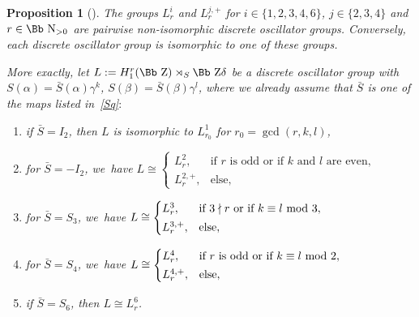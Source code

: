 \documentclass[pdftex]{sigma}
\newcommand\NN{{\mbox{\Bb N}}}
\newcommand\ZZ{{\mbox{\Bb Z}}}
\newcommand{\benur}{\begin{enumerate}[label=$(\roman*)$]\itemsep=0pt}
\numberwithin{equation}{section}
\newtheorem{Proposition}[Theorem]{Proposition}
 { \theoremstyle{definition}
\newtheorem{Definition}[Theorem]{Definition}
\newtheorem{Note}[Theorem]{Note}
\newtheorem{Example}[Theorem]{Example}
\newtheorem{Remark}[Theorem]{Remark} }
\begin{document}
\begin{Proposition}[\cite{F}]\label{TF}
The groups $L^i_r$ and $L^{j,+}_r$ for $i\in\{1,2,3,4,6\}$, $j\in\{2,3,4\}$ and $r\in\NN_{>0}$ are pairwise non-isomorphic discrete oscillator groups.
Conversely, each discrete oscillator group is isomorphic to one of these groups.

More exactly, let $L:=H_1^r(\ZZ)\rtimes_S \ZZ \delta$ be a discrete oscillator group with $S(\alpha)=\bar S(\alpha)\gamma^k$, $S(\beta)=\bar S(\beta)\gamma^l$, where we already assume that $\bar S$ is one of the maps listed in~\eqref{Sq}$:$
\benur
\item if $\bar S=I_2$, then $L$ is isomorphic to $L^1_{r_0}$ for $r_0=\gcd(r,k,l)$,
\item for $\bar S=-I_2$, we~have
$L\cong \begin{cases}
L^2_r, & \text{if $r$ is odd or if $k$ and $l$ are even},
\\[0.5ex]
L^{2,+}_r, & \text{else},
\end{cases}$
\item for $\bar S=S_3$, we~have
$L\cong \begin{cases} L^3_r, & \text{if $3\nmid r$ or if $k\equiv l\ {\rm mod}\ 3$},
\\[0.5ex]
L^{3,+}_r, & \text{else},
\end{cases}$
\item for $\bar S=S_4$, we~have
$L\cong \begin{cases} L^4_r, & \text{if $r$ is odd or if $k\equiv l\ {\rm mod}\ 2$},
\\[0.5ex]
L^{4,+}_r, & \text{else},
\end{cases}$
\item if $\bar S=S_6$, then $L\cong L^6_{r}$.
\end{enumerate}
\end{Proposition}
\end{document}
